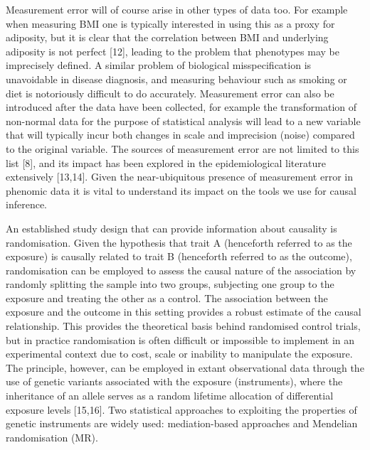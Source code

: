 \documentclass[]{article}
\begin{document}
Measurement error will of course arise in other types of data too. For
example when measuring BMI one is typically interested in using this as
a proxy for adiposity, but it is clear that the correlation between BMI
and underlying adiposity is not perfect {[}12{]}, leading to the problem
that phenotypes may be imprecisely defined. A similar problem of
biological misspecification is unavoidable in disease diagnosis, and
measuring behaviour such as smoking or diet is notoriously difficult to
do accurately. Measurement error can also be introduced after the data
have been collected, for example the transformation of non-normal data
for the purpose of statistical analysis will lead to a new variable that
will typically incur both changes in scale and imprecision (noise)
compared to the original variable. The sources of measurement error are
not limited to this list {[}8{]}, and its impact has been explored in
the epidemiological literature extensively {[}13,14{]}. Given the
near-ubiquitous presence of measurement error in phenomic data it is
vital to understand its impact on the tools we use for causal inference.

An established study design that can provide information about causality
is randomisation. Given the hypothesis that trait A (henceforth referred
to as the exposure) is causally related to trait B (henceforth referred
to as the outcome), randomisation can be employed to assess the causal
nature of the association by randomly splitting the sample into two
groups, subjecting one group to the exposure and treating the other as a
control. The association between the exposure and the outcome in this
setting provides a robust estimate of the causal relationship. This
provides the theoretical basis behind randomised control trials, but in
practice randomisation is often difficult or impossible to implement in
an experimental context due to cost, scale or inability to manipulate
the exposure. The principle, however, can be employed in extant
observational data through the use of genetic variants associated with
the exposure (instruments), where the inheritance of an allele serves as
a random lifetime allocation of differential exposure levels
{[}15,16{]}. Two statistical approaches to exploiting the properties of
genetic instruments are widely used: mediation-based approaches and
Mendelian randomisation (MR).
\end{document}
